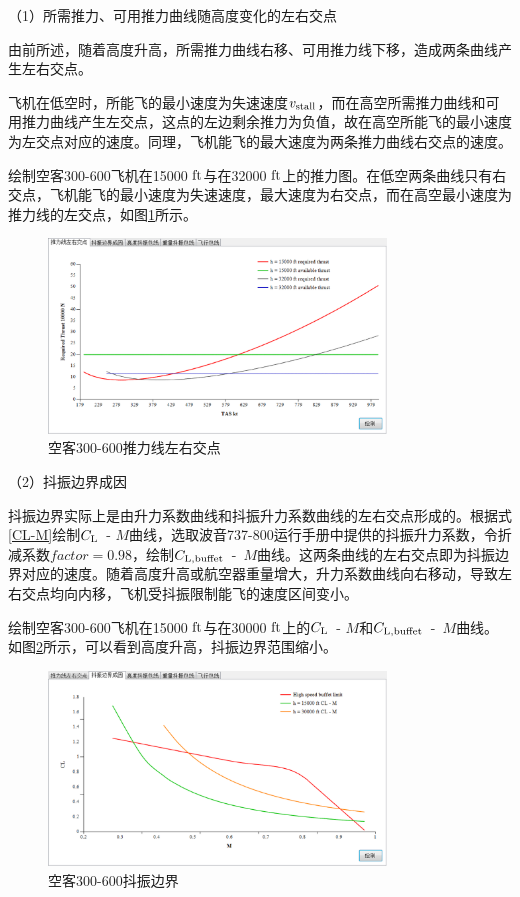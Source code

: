 \documentclass[a4paper,punct,space,heading=true,AutoFakeBold]{ctexrep}
\begin{document}
（1）所需推力、可用推力曲线随高度变化的左右交点

由前所述，随着高度升高，所需推力曲线右移、可用推力线下移，造成两条曲线产生左右交点。

飞机在低空时，所能飞的最小速度为失速速度$v_{\rm stall}$，而在高空所需推力曲线和可用推力曲线产生左交点，这点的左边剩余推力为负值，故在高空所能飞的最小速度为左交点对应的速度。同理，飞机能飞的最大速度为两条推力曲线右交点的速度。

绘制空客300-600飞机在15000 $\rm ft$与在32000 $\rm ft$上的推力图。在低空两条曲线只有右交点，飞机能飞的最小速度为失速速度，最大速度为右交点，而在高空最小速度为推力线的左交点，如图\ref{leftrightcrosspointinF-V}所示。


\begin{figure}[h]
	\centering
	\includegraphics[width=0.8\textwidth]{pic/leftrightcrosspointinF-V.eps}\hspace{30pt}
	\caption{空客300-600推力线左右交点}\label{leftrightcrosspointinF-V}
\end{figure}


（2）抖振边界成因

抖振边界实际上是由升力系数曲线和抖振升力系数曲线的左右交点形成的。根据式\ref{CL-M}绘制$C_{\rm L}$\ - $M$曲线，选取波音737-800运行手册中提供的抖振升力系数，令折减系数$factor=0.98$，绘制$C_{\rm L,buffet}$\ -\ $M$曲线。这两条曲线的左右交点即为抖振边界对应的速度。随着高度升高或航空器重量增大，升力系数曲线向右移动，导致左右交点均向内移，飞机受抖振限制能飞的速度区间变小。

绘制空客300-600飞机在15000 $\rm ft$与在30000 $\rm ft$上的$C_{\rm L}$\ - $M$和$C_{\rm L,buffet}$\ -\ $M$曲线。如图\ref{buffetboundary}所示，可以看到高度升高，抖振边界范围缩小。

\begin{figure}[h]
	\centering
	\includegraphics[width=0.8\textwidth]{pic/buffetboundary.eps}\hspace{30pt}
	\caption{空客300-600抖振边界}\label{buffetboundary}
\end{figure}
\end{document}
